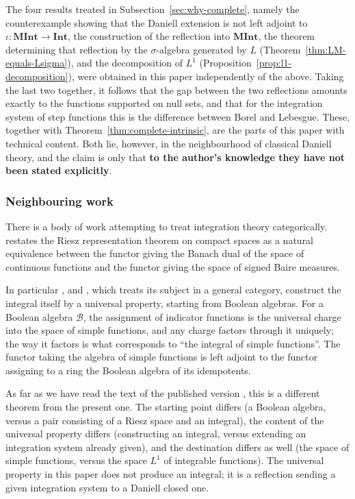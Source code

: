 The four results treated in
Subsection~\ref{sec:why-complete}, namely the counterexample showing that the
Daniell extension is not left adjoint to
$\iota:\mathbf{MInt}\to\mathbf{Int}$, the construction of the reflection into
$\mathbf{MInt}$, the theorem determining that reflection by the
$\sigma$-algebra generated by $L$
(Theorem~\ref{thm:LM-equals-Lsigma}), and the decomposition of $L^1$
(Proposition~\ref{prop:l1-decomposition}), were obtained in this paper
independently of the above.
Taking the last two together, it follows that the gap between the two
reflections amounts exactly to the functions supported on null sets, and that for
the integration system of step functions this is the difference between Borel
and Lebesgue.
These, together with
Theorem~\ref{thm:complete-intrinsic}, are the parts of this paper with technical
content.
Both lie, however, in the neighbourhood of classical Daniell theory, and the
claim is only that \textbf{to the author's knowledge they have not been stated
explicitly}.

\subsubsection{Neighbouring work}

There is a body of work attempting to treat integration theory categorically.
\cite{Hartig} restates the Riesz representation theorem on compact spaces as a
natural equivalence between the functor giving the Banach dual of the space of
continuous functions and the functor giving the space of signed Baire measures.

In particular \cite{BorgerHabil}, and \cite{Borger2010}, which treats its
subject in a general category, construct the integral itself by a universal
property, starting from Boolean algebras.
For a Boolean algebra $\mathcal{B}$, the assignment of indicator functions is the
universal charge into the space of simple functions, and any charge factors
through it uniquely; the way it factors is what corresponds to ``the integral of
simple functions''.
The functor taking the algebra of simple functions is left adjoint to the functor
assigning to a ring the Boolean algebra of its idempotents.

As far as we have read the text of the published version \cite{Borger2010}, this
is a different theorem from the present one.
The starting point differs (a Boolean algebra, versus a pair consisting of a
Riesz space and an integral), the content of the universal property differs
(constructing an integral, versus extending an integration system already
given), and the destination differs as well (the space of simple functions,
versus the space $L^1$ of integrable functions).
The universal property in this paper does not produce an integral; it is a
reflection sending a given integration system to a Daniell closed one.

